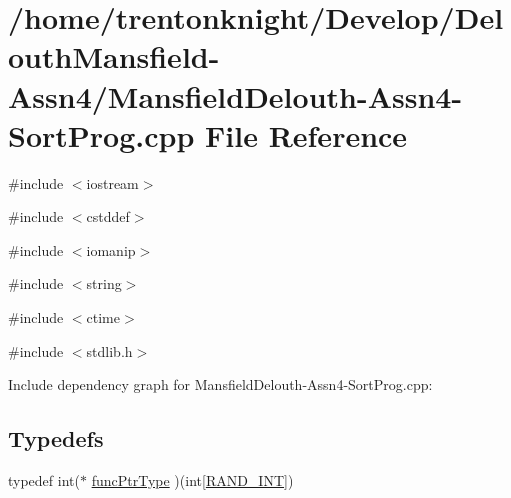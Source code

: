 \hypertarget{_mansfield_delouth-_assn4-_sort_prog_8cpp}{
\section{/home/trentonknight/Develop/DelouthMansfield-\/Assn4/MansfieldDelouth-\/Assn4-\/SortProg.cpp File Reference}
\label{_mansfield_delouth-_assn4-_sort_prog_8cpp}
}
{\ttfamily \#include $<$iostream$>$}\par
{\ttfamily \#include $<$cstddef$>$}\par
{\ttfamily \#include $<$iomanip$>$}\par
{\ttfamily \#include $<$string$>$}\par
{\ttfamily \#include $<$ctime$>$}\par
{\ttfamily \#include $<$stdlib.h$>$}\par
Include dependency graph for MansfieldDelouth-\/Assn4-\/SortProg.cpp:\subsection*{Typedefs}
\begin{DoxyCompactItemize}
\item 
typedef int($\ast$ \hyperlink{_mansfield_delouth-_assn4-_sort_prog_8cpp_ae2987d0004dea58df8c833858c0fb370}{funcPtrType} )(int\mbox{[}\hyperlink{_mansfield_delouth-_assn4-_sort_prog_8cpp_a134c2ba56ae9ba89c77a5c0dba9f2124}{RAND\_\-INT}\mbox{]})
\end{DoxyCompactItemize}

